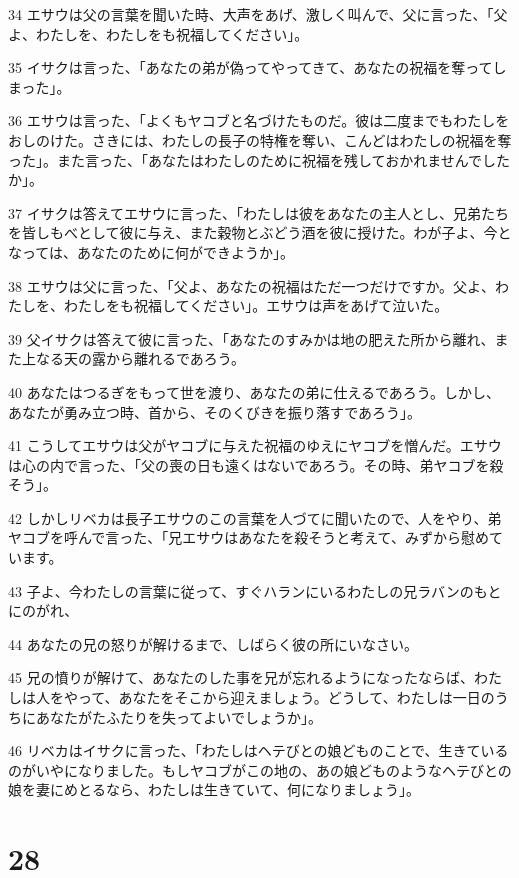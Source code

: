 \par 34 エサウは父の言葉を聞いた時、大声をあげ、激しく叫んで、父に言った、「父よ、わたしを、わたしをも祝福してください」。
\par 35 イサクは言った、「あなたの弟が偽ってやってきて、あなたの祝福を奪ってしまった」。
\par 36 エサウは言った、「よくもヤコブと名づけたものだ。彼は二度までもわたしをおしのけた。さきには、わたしの長子の特権を奪い、こんどはわたしの祝福を奪った」。また言った、「あなたはわたしのために祝福を残しておかれませんでしたか」。
\par 37 イサクは答えてエサウに言った、「わたしは彼をあなたの主人とし、兄弟たちを皆しもべとして彼に与え、また穀物とぶどう酒を彼に授けた。わが子よ、今となっては、あなたのために何ができようか」。
\par 38 エサウは父に言った、「父よ、あなたの祝福はただ一つだけですか。父よ、わたしを、わたしをも祝福してください」。エサウは声をあげて泣いた。
\par 39 父イサクは答えて彼に言った、「あなたのすみかは地の肥えた所から離れ、また上なる天の露から離れるであろう。
\par 40 あなたはつるぎをもって世を渡り、あなたの弟に仕えるであろう。しかし、あなたが勇み立つ時、首から、そのくびきを振り落すであろう」。
\par 41 こうしてエサウは父がヤコブに与えた祝福のゆえにヤコブを憎んだ。エサウは心の内で言った、「父の喪の日も遠くはないであろう。その時、弟ヤコブを殺そう」。
\par 42 しかしリベカは長子エサウのこの言葉を人づてに聞いたので、人をやり、弟ヤコブを呼んで言った、「兄エサウはあなたを殺そうと考えて、みずから慰めています。
\par 43 子よ、今わたしの言葉に従って、すぐハランにいるわたしの兄ラバンのもとにのがれ、
\par 44 あなたの兄の怒りが解けるまで、しばらく彼の所にいなさい。
\par 45 兄の憤りが解けて、あなたのした事を兄が忘れるようになったならば、わたしは人をやって、あなたをそこから迎えましょう。どうして、わたしは一日のうちにあなたがたふたりを失ってよいでしょうか」。
\par 46 リベカはイサクに言った、「わたしはヘテびとの娘どものことで、生きているのがいやになりました。もしヤコブがこの地の、あの娘どものようなヘテびとの娘を妻にめとるなら、わたしは生きていて、何になりましょう」。

\chapter{28}

